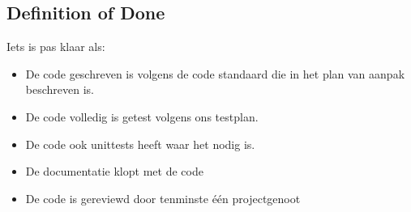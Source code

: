 \subsection{Definition of Done}
Iets is pas klaar als:
\begin{itemize}
    \item De code geschreven is volgens de code standaard die in het plan
        van aanpak beschreven is.
    \item De code volledig is getest volgens ons testplan.
    \item De code ook unittests heeft waar het nodig is.
    \item De documentatie klopt met de code
    \item De code is gereviewd door tenminste één projectgenoot
\end{itemize}

